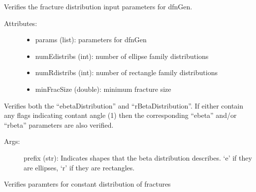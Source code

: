 \documentclass[letterpaper,10pt,english]{sphinxmanual}
\begin{document}
\begin{fulllineitems}
\label{pydfnworks:pydfnworks.distributions.distr}
Verifies the fracture distribution input parameters for dfnGen.
\begin{description}
\item[{Attributes:}] \leavevmode\begin{itemize}
\item {} 
params (list): parameters for dfnGen

\item {} 
numEdistribs (int): number of ellipse family distributions

\item {} 
numRdistribs (int): number of rectangle family distributions

\item {} 
minFracSize (double): minimum fracture size

\end{itemize}

\end{description}

\begin{fulllineitems}
\label{pydfnworks:pydfnworks.distributions.distr.betaDistribution}
Verifies both the ``ebetaDistribution'' and ``rBetaDistribution''. If either contain any flags
indicating contant angle (1) then the corresponding ``ebeta'' and/or ``rbeta'' parameters are 
also verified.
\begin{description}
\item[{Args:}] \leavevmode
prefix (str): Indicates shapes that the beta distribution describes. `e' if they are ellipses, `r' if they are rectangles.

\end{description}

\end{fulllineitems}


\begin{fulllineitems}
\label{pydfnworks:pydfnworks.distributions.distr.constantDist}
Verifies paramters for constant distribution of fractures


\end{fulllineitems}
\end{fulllineitems}
\end{document}
